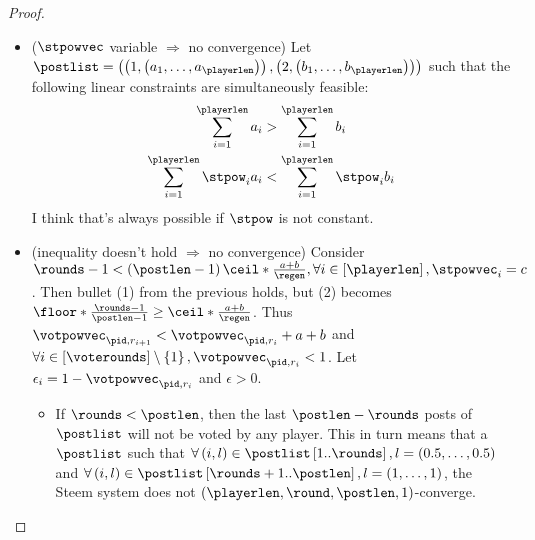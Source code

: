 \begin{proof}
\begin{itemize}
    \item ($\stpowvec$ variable $\Rightarrow$ no convergence) Let $\postlist =
    \left(\left(1, \left(a_1, \dots, a_\playerlen\right)\right), \left(2,
    \left(b_1, \dots, b_\playerlen\right)\right)\right)$ such that the following
    linear constraints are simultaneously feasible:
    \begin{gather*}
      \sum\limits_{i=1}^\playerlen a_i > \sum\limits_{i=1}^\playerlen b_i \\
      \sum\limits_{i=1}^\playerlen \stpow_i a_i < \sum\limits_{i=1}^\playerlen
      \stpow_i  b_i
    \end{gather*}
    I think that's always possible if $\stpow$ is not constant.

    \item (inequality doesn't hold $\Rightarrow$ no convergence) Consider
    $\rounds - 1 < \left(\postlen - 1\right)\ceil*{\frac{a+b}{\regen}}, \forall
    i \in \left[\playerlen\right], \stpowvec_i = c$. Then bullet (1) from the
    previous holds, but (2) becomes $\floor*{\frac{\rounds - 1}{\postlen - 1}}
    \geq \ceil*{\frac{a+b}{\regen}}$. Thus $\votpowvec_{\pid, r_{i + 1}} <
    \votpowvec_{\pid, r_i} + a + b$ and $\forall i \in \left[\voterounds\right]
    \setminus \left\{1\right\}, \votpowvec_{\pid, r_i} < 1$. Let $\epsilon_i = 1
    - \votpowvec_{\pid, r_i}$ and $\epsilon > 0$.
    \begin{itemize}
      \item If $\rounds < \postlen$, then the last $\postlen - \rounds$ posts of
      $\postlist$ will not be voted by any player. This in turn means that a
      $\postlist$ such that $\forall \left(i, l\right) \in
      \postlist\left[1..\rounds\right], l = \left(0.5, \dots, 0.5\right)$ and
      $\forall \left(i, l\right) \in \postlist\left[\rounds +
      1..\postlen\right], l = \left(1, \dots, 1\right)$, the Steem system does
      not $\left(\playerlen, \round, \postlen, 1\right)$-converge.


\end{itemize}
\end{itemize}
\end{proof}
